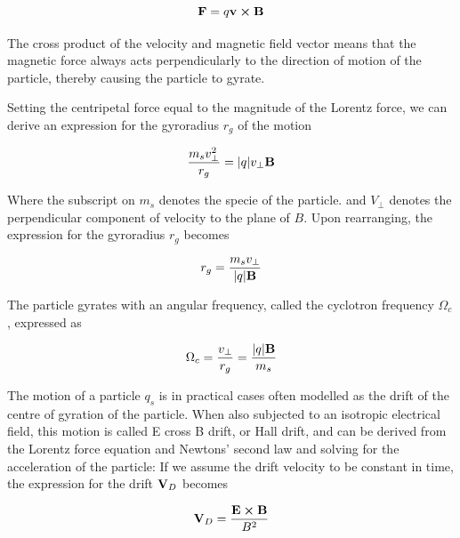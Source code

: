 \begin{equation}\label{eq:magF}
    \vb{F} = q \vb{v} \cp \vb{B}
\end{equation}

The cross product of the velocity and magnetic field vector means that the magnetic force always acts perpendicularly to the direction of motion of the particle, thereby causing the particle to gyrate.

Setting the centripetal force equal to the magnitude of the Lorentz force, we can derive an expression for the gyroradius $r_g$ of the motion

\begin{equation}\label{eq:gyrorad}
    \frac{m_s v_{\perp}^2}{r_g} = \abs{q} v_{\perp} \vb{B}
\end{equation}

Where the subscript on $m_s$ denotes the specie of the particle. and $V_\perp$ denotes the perpendicular component of velocity to  the plane of $B$. Upon rearranging, the expression for the gyroradius $r_g$ becomes

\begin{equation}
    r_g = \frac{m_s v_\perp}{\abs{q} \vb{B}}
\end{equation}

The particle gyrates with an angular frequency, called the cyclotron frequency $\Omega_c$, expressed as 

\begin{equation}
    \Omega_c = \frac{v_\perp}{r_g} = \frac{\abs{q} \vb{B}}{m_s}
\end{equation}

The motion of a particle $q_s$ is in practical cases often modelled as the drift of the centre of gyration of the particle. When also subjected to an isotropic electrical field, this motion is called E cross B drift, or Hall drift, and can be derived from the Lorentz force equation and Newtons' second law and solving for the acceleration of the particle: If we assume the drift velocity to be constant in time, the expression for the drift $\vb{V}_D$ becomes

\begin{equation}
    \vb{V}_D = \frac{\vb{E} \cp \vb{B}}{B^2}
\end{equation}

